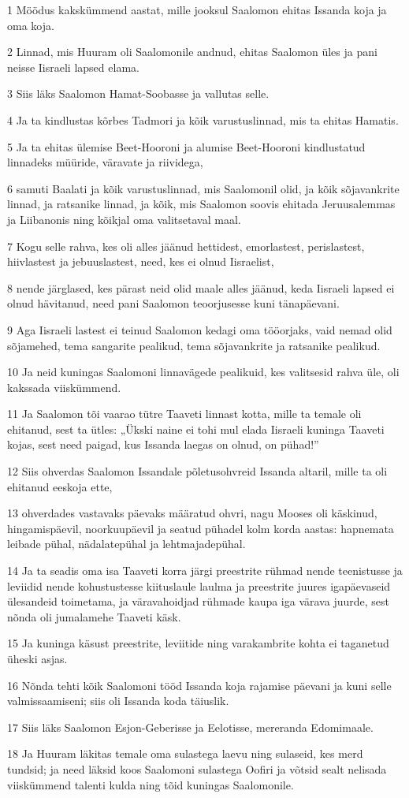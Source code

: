 \par 1 Möödus kakskümmend aastat, mille jooksul Saalomon ehitas Issanda koja ja oma koja.
\par 2 Linnad, mis Huuram oli Saalomonile andnud, ehitas Saalomon üles ja pani neisse Iisraeli lapsed elama.
\par 3 Siis läks Saalomon Hamat-Soobasse ja vallutas selle.
\par 4 Ja ta kindlustas kõrbes Tadmori ja kõik varustuslinnad, mis ta ehitas Hamatis.
\par 5 Ja ta ehitas ülemise Beet-Hooroni ja alumise Beet-Hooroni kindlustatud linnadeks müüride, väravate ja riividega,
\par 6 samuti Baalati ja kõik varustuslinnad, mis Saalomonil olid, ja kõik sõjavankrite linnad, ja ratsanike linnad, ja kõik, mis Saalomon soovis ehitada Jeruusalemmas ja Liibanonis ning kõikjal oma valitsetaval maal.
\par 7 Kogu selle rahva, kes oli alles jäänud hettidest, emorlastest, perislastest, hiivlastest ja jebuuslastest, need, kes ei olnud Iisraelist,
\par 8 nende järglased, kes pärast neid olid maale alles jäänud, keda Iisraeli lapsed ei olnud hävitanud, need pani Saalomon teoorjusesse kuni tänapäevani.
\par 9 Aga Iisraeli lastest ei teinud Saalomon kedagi oma tööorjaks, vaid nemad olid sõjamehed, tema sangarite pealikud, tema sõjavankrite ja ratsanike pealikud.
\par 10 Ja neid kuningas Saalomoni linnavägede pealikuid, kes valitsesid rahva üle, oli kakssada viiskümmend.
\par 11 Ja Saalomon tõi vaarao tütre Taaveti linnast kotta, mille ta temale oli ehitanud, sest ta ütles: „Ükski naine ei tohi mul elada Iisraeli kuninga Taaveti kojas, sest need paigad, kus Issanda laegas on olnud, on pühad!”
\par 12 Siis ohverdas Saalomon Issandale põletusohvreid Issanda altaril, mille ta oli ehitanud eeskoja ette,
\par 13 ohverdades vastavaks päevaks määratud ohvri, nagu Mooses oli käskinud, hingamispäevil, noorkuupäevil ja seatud pühadel kolm korda aastas: hapnemata leibade pühal, nädalatepühal ja lehtmajadepühal.
\par 14 Ja ta seadis oma isa Taaveti korra järgi preestrite rühmad nende teenistusse ja leviidid nende kohustustesse kiituslaule laulma ja preestrite juures igapäevaseid ülesandeid toimetama, ja väravahoidjad rühmade kaupa iga värava juurde, sest nõnda oli jumalamehe Taaveti käsk.
\par 15 Ja kuninga käsust preestrite, leviitide ning varakambrite kohta ei taganetud üheski asjas.
\par 16 Nõnda tehti kõik Saalomoni tööd Issanda koja rajamise päevani ja kuni selle valmissaamiseni; siis oli Issanda koda täiuslik.
\par 17 Siis läks Saalomon Esjon-Geberisse ja Eelotisse, mereranda Edomimaale.
\par 18 Ja Huuram läkitas temale oma sulastega laevu ning sulaseid, kes merd tundsid; ja need läksid koos Saalomoni sulastega Oofiri ja võtsid sealt nelisada viiskümmend talenti kulda ning tõid kuningas Saalomonile.

